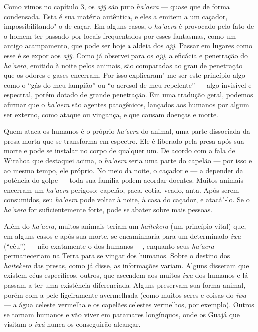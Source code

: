 Como vimos no capítulo 3, os \emph{ajỹ} são puro \emph{ha'aera} --- quase
que de forma condensada. Esta é sua matéria autêntica, e eles a emitem a
um caçador, impossibilitando"-o de caçar. Em alguns casos, o
\emph{ha'aera} é provocado pelo fato de o homem ter passado por locais
frequentados por esses fantasmas, como um antigo acampamento, que pode
ser hoje a aldeia dos \emph{ajỹ}. Passar em lugares como esse é se expor
aos \emph{ajỹ}. Como já observei para os \emph{ajỹ}, a eficácia e
penetração do \emph{ha'aera}, emitido à noite pelos animais, são
comparadas ao grau de penetração que os odores e gases encerram. Por
isso explicaram"-me ser este princípio algo como o ``gás do meu lampião''
ou ``o aerosol de meu repelente'' --- algo invisível e espectral, porém
dotado de grande penetração. Em uma tradução geral, podemos afirmar que
o \emph{ha'aera} são agentes patogênicos, lançados aos humanos por algum
ser externo, como ataque ou vingança, e que causam doenças e morte.

Quem ataca os humanos é o próprio \emph{ha'aera} do animal, uma parte
dissociada da presa morta que se transforma em espectro. Ele é liberado
pela presa após sua morte e pode se instalar no corpo de qualquer um. De
acordo com a fala de Wirahoa que destaquei acima, o \emph{ha'aera} seria
uma parte do capelão --- por isso e ao mesmo tempo, ele próprio. No meio
da noite, o caçador e --- a depender da potência do golpe --- toda sua
família podem acordar doentes. Muitos animais encerram um \emph{ha'aera}
perigoso: capelão, paca, cotia, veado, anta. Após serem consumidos, seu
\emph{ha'aera} pode voltar à noite, à casa do caçador, e atacá"-lo. Se o
\emph{ha'aera} for suficientemente forte, pode se abater sobre mais
pessoas.

Além do \emph{ha'aera}, muitos animais teriam um \emph{haitekera} (um
princípio vital) que, em alguns casos e após sua morte, se encaminharia
para um determinado \emph{iwa} (``céu'') --- não exatamente o dos humanos ---,
enquanto seus \emph{ha'aera} permaneceriam na Terra para se vingar dos
humanos. Sobre o destino dos \emph{haitekera} das presas, como já disse,
as informações variam. Alguns disseram que existem céus específicos,
outros, que ascendem aos muitos \emph{iwa} dos humanos e lá passam a ter
uma existência diferenciada. Alguns preservam sua forma animal, porém
com a pele ligeiramente avermelhada (como muitos seres e coisas do
\emph{iwa} --- a água celeste vermelha e os capelães celestes vermelhos,
por exemplo). Outros se tornam humanos e vão viver em patamares
longínquos, onde os Guajá que visitam o \emph{iwá} nunca os conseguirão
alcançar.

